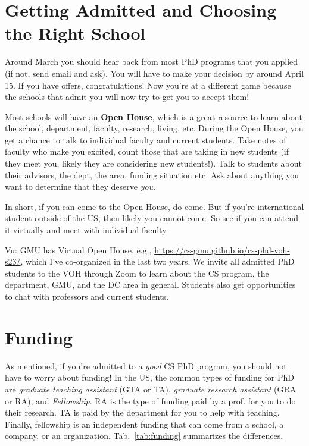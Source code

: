 \documentclass[11pt]{article}
\newenvironment{commentbox}{
 \small
    \begin{cbox}
 }{
   \end{cbox}
}
\begin{document}
\section{Getting Admitted and Choosing the Right School}

Around March you should hear back from most PhD programs that you applied (if not, send email and ask). You will have to make your decision by around April 15.
If you have offers, congratulations!  Now you're at a different game because the schools that admit you will now try to get you to accept them!  

Most schools will have an \textbf{Open House}, which is a great resource to learn about the school, department, faculty, research, living, etc. During the Open House, you get a chance to talk to individual faculty and current students.  Take notes of faculty who make you excited, count those that are taking in new students (if they meet you, likely they are considering new students!).  Talk to students about their advisors, the dept, the area, funding situation etc.  Ask about anything you want to determine that they deserve \emph{you}.

In short, if you can come to the Open House, do come.  But if you're international student outside of the US, then likely you cannot come.  So see if you can attend it virtually and meet with individual faculty.

\begin{commentbox}
Vu: GMU has Virtual Open House, e.g., \url{https://cs-gmu.github.io/cs-phd-voh-s23/}, which I've co-organized in the last two years. We invite all admitted PhD students to the VOH through Zoom to learn about the CS program, the department, GMU, and the DC area in general. Students also get opportunities to chat with professors and current students.
\end{commentbox}



\section{Funding}\label{sec:funding}

As mentioned, if you're admitted to a \emph{good} CS PhD program, you should not have to worry about funding!  
In the US, the common types of funding for PhD are \emph{graduate teaching assistant} (GTA or TA), \emph{graduate research assistant} (GRA or RA), and \emph{Fellowship}.
RA is the type of funding paid by a prof. for you to do their research. TA is paid by the department for you to help with teaching. Finally, fellowship is an independent funding that can come from a school, a company, or an organization. Tab.~\ref{tab:funding} summarizes the differences. 
\end{document}
